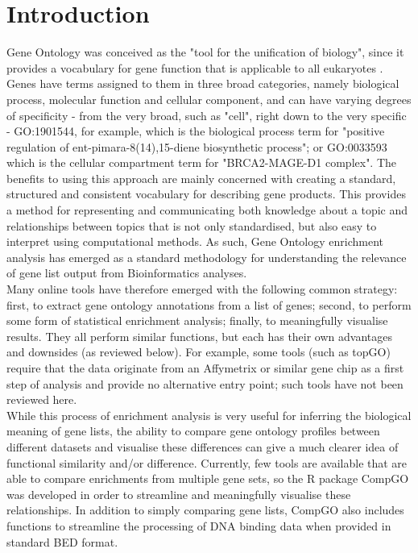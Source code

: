\documentclass[11pt, oneside]{article}
\begin{document}
\section*{Introduction}
Gene Ontology was conceived as the "tool for the unification of biology", since it provides a vocabulary for gene function that is applicable to all eukaryotes \cite{GOConsort00}. Genes have terms assigned to them in three broad categories, namely biological process, molecular function and cellular component, and can have varying degrees of specificity - from the very broad, such as "cell", right down to the very specific - GO:1901544, for example, which is the biological process term for "positive regulation of ent-pimara-8(14),15-diene biosynthetic process"; or GO:0033593 which is the cellular compartment term for "BRCA2-MAGE-D1 complex". The benefits to using this approach are mainly concerned with creating a standard, structured and consistent vocabulary for describing gene products. This provides a method for representing and communicating both knowledge about a topic and relationships between topics that is not only standardised, but also easy to interpret using computational methods. As such, Gene Ontology enrichment analysis has emerged as a standard methodology for understanding the relevance of gene list output from Bioinformatics analyses.\\
Many online tools have therefore emerged with the following common strategy: first, to extract gene ontology annotations from a list of genes; second, to perform some form of statistical enrichment analysis; finally, to meaningfully visualise results. They all perform similar functions, but each has their own advantages and downsides (as reviewed below). For example, some tools (such as topGO) require that the data originate from an Affymetrix or similar gene chip as a first step of analysis and provide no alternative entry point; such tools have not been reviewed here.\\
While this process of enrichment analysis is very useful for inferring the biological meaning of gene lists, the ability to compare gene ontology profiles between different datasets and visualise these differences can give a much clearer idea of functional similarity and/or difference. Currently, few tools are available that are able to compare enrichments from multiple gene sets, so the R package CompGO was developed in order to streamline and meaningfully visualise these relationships. In addition to simply comparing gene lists, CompGO also includes functions to streamline the processing of DNA binding data when provided in standard BED format.
\end{document}
